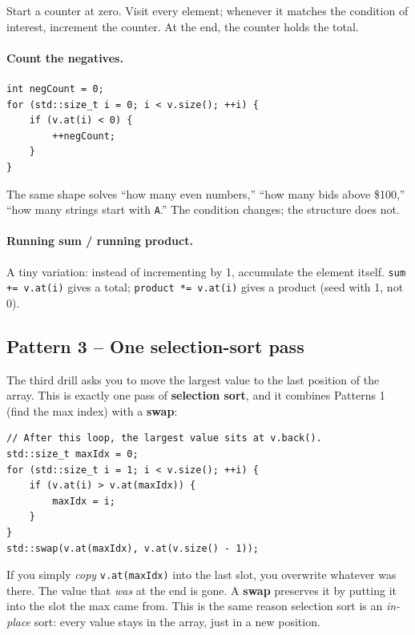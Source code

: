 \documentclass[11pt]{article}
\begin{document}
\begin{ideabox}
Start a counter at zero. Visit every element; whenever it matches the
condition of interest, increment the counter. At the end, the counter
holds the total.
\end{ideabox}

\paragraph{Count the negatives.}
\begin{lstlisting}
int negCount = 0;
for (std::size_t i = 0; i < v.size(); ++i) {
    if (v.at(i) < 0) {
        ++negCount;
    }
}
\end{lstlisting}

The same shape solves ``how many even numbers,'' ``how many bids above
\$100,'' ``how many strings start with \texttt{A}.'' The condition
changes; the structure does not.

\paragraph{Running sum / running product.} A tiny variation: instead
of incrementing by 1, accumulate the element itself. \texttt{sum +=
v.at(i)} gives a total; \texttt{product *= v.at(i)} gives a product
(seed with 1, not 0).

\subsection{Pattern 3 -- One selection-sort pass}

The third drill asks you to move the largest value to the last
position of the array. This is exactly one pass of \textbf{selection
sort}, and it combines Patterns 1 (find the max index) with a
\textbf{swap}:
\begin{lstlisting}
// After this loop, the largest value sits at v.back().
std::size_t maxIdx = 0;
for (std::size_t i = 1; i < v.size(); ++i) {
    if (v.at(i) > v.at(maxIdx)) {
        maxIdx = i;
    }
}
std::swap(v.at(maxIdx), v.at(v.size() - 1));
\end{lstlisting}

\begin{notebox}
If you simply \emph{copy} \texttt{v.at(maxIdx)} into the last slot,
you overwrite whatever was there. The value that \emph{was} at the end
is gone. A \textbf{swap} preserves it by putting it into the slot the
max came from. This is the same reason selection sort is an
\emph{in-place} sort: every value stays in the array, just in a new
position.
\end{notebox}
\end{document}
